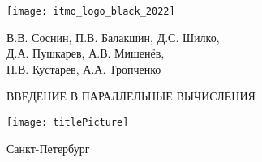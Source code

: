 
\thispagestyle{empty}
\begin{center}
    \texttt{[image: itmo\_logo\_black\_2022]}

    \vspace*{\fill}

    \begin{bfseries}
        \begin{Large}
            В.В. Соснин, П.В. Балакшин, Д.С. Шилко, \\
            Д.А. Пушкарев, А.В. Мишенёв, \\
            П.В. Кустарев, А.А. Тропченко 
        
            \vspace*{\fill}
        
            \centerline{ВВЕДЕНИЕ В ПАРАЛЛЕЛЬНЫЕ ВЫЧИСЛЕНИЯ}
        \end{Large}
     
        \vspace*{\fill}
        
        \texttt{[image: titlePicture]}
        
        \vspace*{\fill}
        
        \begin{large}
            Санкт-Петербург \\ \the\year
        \end{large}
    \end{bfseries}   
\end{center}

    
    
    
    
    
    
    
